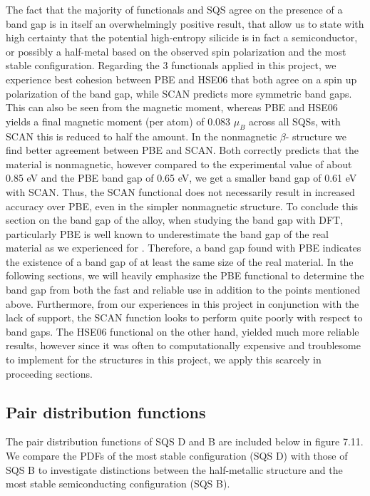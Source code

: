 The fact that the majority of functionals and SQS agree on the presence of a band gap is in itself an overwhelmingly positive result, that allow us to state with high certainty that the potential high-entropy silicide  is in fact a semiconductor, or possibly a half-metal based on the observed spin polarization and the most stable configuration. Regarding the 3 functionals applied in this project, we experience best cohesion between PBE and HSE06 that both agree on a spin up polarization of the band gap, while SCAN predicts more symmetric band gaps. This can also be seen from the magnetic moment, whereas PBE and HSE06 yields a final magnetic moment (per atom) of 0.083 $\mu_B$ across all SQSs, with SCAN this is reduced to half the amount. In the nonmagnetic $\beta$- structure we find better agreement between PBE and SCAN. Both correctly predicts that the material is nonmagnetic, however compared to the experimental value of about 0.85 eV and the PBE band gap of 0.65 eV, we get a smaller band gap of 0.61 eV with SCAN. Thus, the SCAN functional does not necessarily result in increased accuracy over PBE, even in the  simpler nonmagnetic structure. To conclude this section on the band gap of the  alloy, when studying the band gap with DFT, particularly PBE is well known to underestimate the band gap of the real material as we experienced for . Therefore, a band gap found with PBE
indicates the existence of a band gap of at least the same size of the real material. In the following sections, we will heavily emphasize the PBE functional to determine the band gap from both the fast and reliable use in addition to the points mentioned above. Furthermore, from our experiences in this project in conjunction with the lack of support, the SCAN function looks to perform quite poorly with respect to band gaps. The HSE06 functional on the other hand, yielded much more reliable results, however since it was often to computationally expensive and troublesome to implement for the structures in this project, we apply this scarcely in proceeding sections. 
 
\subsection{Pair distribution functions}
The pair distribution functions of SQS D and B are included below in figure 7.11. We compare the PDFs of the most stable configuration (SQS D) with those of SQS B to investigate distinctions between the half-metallic structure and the most stable semiconducting configuration (SQS B). 
 
